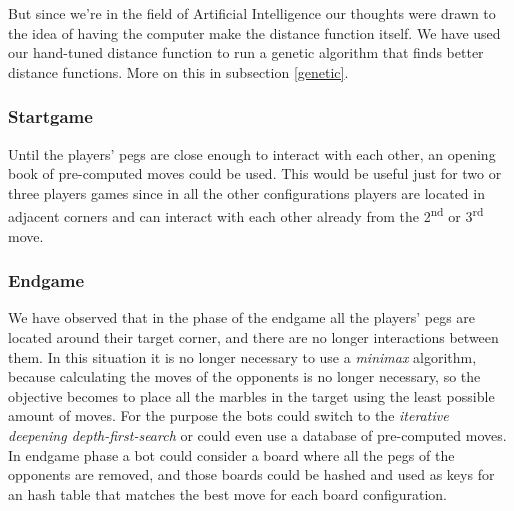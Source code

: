 \documentclass[a4paper,11pt]{article}
\begin{document}
But since we're in the field of Artificial Intelligence our thoughts
were drawn to the idea of having the computer make the distance
function itself. We have used our hand-tuned distance function to run
a genetic algorithm that finds better distance functions. More on this
in subsection \ref{genetic}.

\subsubsection{Startgame}
Until the players' pegs are close enough to interact with each other, an opening
book of pre-computed moves could be used. This would be useful just for two or
three players games since in all the other configurations players are located in
adjacent corners and can interact with each other already from the
 2\textsuperscript{nd} or 3\textsuperscript{rd} move.

\subsubsection{Endgame}
We have observed that in the phase of the endgame all the players' pegs are
located around their target corner, and there are no longer interactions between
them.
In this situation it is no longer necessary to use a \emph{minimax} algorithm,
because calculating the moves of the opponents is no longer necessary, so the
objective becomes to place all the marbles in the target using the least
possible amount of moves.
For the purpose the bots could switch to the \emph{iterative deepening
depth-first-search} or could even use a database of pre-computed moves.
In endgame phase a bot could consider a board where all the pegs of the
opponents are removed, and those boards could be hashed and used as keys for an
hash table that matches the best move for each board configuration.



\end{document}
